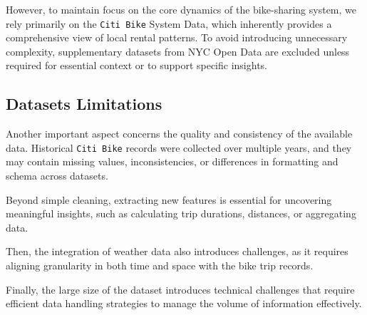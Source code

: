 However, to maintain focus on the core dynamics of the bike-sharing system, we rely primarily on the \texttt{Citi Bike} System Data, which inherently provides a comprehensive view of local rental patterns.
To avoid introducing unnecessary complexity, supplementary datasets from NYC Open Data are excluded unless required for essential context or to support specific insights.

\subsection{Datasets Limitations}
Another important aspect concerns the quality and consistency of the available data.
Historical \texttt{Citi Bike} records were collected over multiple years, and they may contain missing values, inconsistencies, or differences in formatting and schema across datasets.

Beyond simple cleaning, extracting new features is essential for uncovering meaningful insights, such as calculating trip durations, distances, or aggregating data.

Then, the integration of weather data also introduces challenges, as it requires aligning granularity in both time and space with the bike trip records.

Finally, the large size of the dataset introduces technical challenges that require efficient data handling strategies to manage the volume of information effectively.